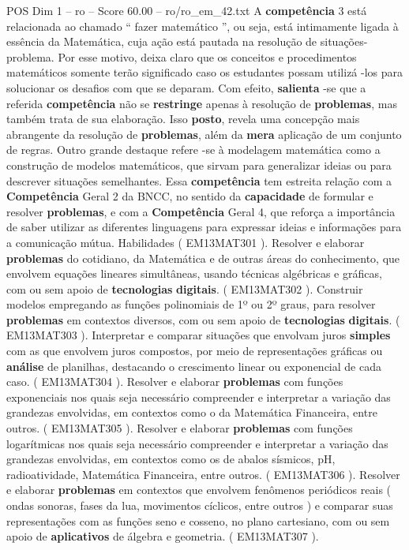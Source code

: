 \begin{textsample}{POS Dim 1 – ro – Score 60.00 – ro/ro\_em\_42.txt}
A \textbf{competência} 3 está relacionada ao chamado “ fazer matemático ”, ou seja, está intimamente ligada à essência da Matemática, cuja ação está pautada na resolução de situações-problema.
Por esse motivo, deixa claro que os conceitos e procedimentos matemáticos somente terão significado caso os estudantes possam utilizá -los para solucionar os desafios com que se deparam.
Com efeito, \textbf{salienta} -se que a referida \textbf{competência} não se \textbf{restringe} apenas à resolução de \textbf{problemas}, mas também trata de sua elaboração.
Isso \textbf{posto}, revela uma concepção mais abrangente da resolução de \textbf{problemas}, além da \textbf{mera} aplicação de um conjunto de regras.
Outro grande destaque refere -se à modelagem matemática como a construção de modelos matemáticos, que sirvam para generalizar ideias ou para descrever situações semelhantes.
Essa \textbf{competência} tem estreita relação com a \textbf{Competência} Geral 2 da BNCC, no sentido da \textbf{capacidade} de formular e resolver \textbf{problemas}, e com a \textbf{Competência} Geral 4, que reforça a importância de saber utilizar as diferentes linguagens para expressar ideias e informações para a comunicação mútua.
Habilidades ( EM13MAT301 ).
Resolver e elaborar \textbf{problemas} do cotidiano, da Matemática e de outras áreas do conhecimento, que envolvem equações lineares simultâneas, usando técnicas algébricas e gráficas, com ou sem apoio de \textbf{tecnologias} \textbf{digitais}. ( EM13MAT302 ).
Construir modelos empregando as funções polinomiais de 1º ou 2º graus, para resolver \textbf{problemas} em contextos diversos, com ou sem apoio de \textbf{tecnologias} \textbf{digitais}. ( EM13MAT303 ).
Interpretar e comparar situações que envolvam juros \textbf{simples} com as que envolvem juros compostos, por meio de representações gráficas ou \textbf{análise} de planilhas, destacando o crescimento linear ou exponencial de cada caso. ( EM13MAT304 ).
Resolver e elaborar \textbf{problemas} com funções exponenciais nos quais seja necessário compreender e interpretar a variação das grandezas envolvidas, em contextos como o da Matemática Financeira, entre outros. ( EM13MAT305 ).
Resolver e elaborar \textbf{problemas} com funções logarítmicas nos quais seja necessário compreender e interpretar a variação das grandezas envolvidas, em contextos como os de abalos sísmicos, pH, radioatividade, Matemática Financeira, entre outros. ( EM13MAT306 ).
Resolver e elaborar \textbf{problemas} em contextos que envolvem fenômenos periódicos reais ( ondas sonoras, fases da lua, movimentos cíclicos, entre outros ) e comparar suas representações com as funções seno e cosseno, no plano cartesiano, com ou sem apoio de \textbf{aplicativos} de álgebra e geometria. ( EM13MAT307 ).

\end{textsample}
